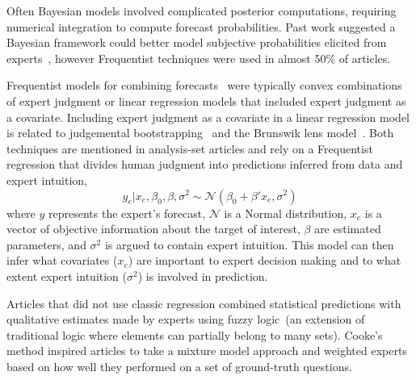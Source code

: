\documentclass[preprint,authoryear]{elsarticle}
\begin{document}
Often Bayesian models involved complicated posterior computations, requiring numerical integration to compute forecast probabilities.
Past work suggested a Bayesian framework could better model subjective probabilities elicited from experts~\citep{clemen2007advances}, however Frequentist techniques were used in almost 50\% of articles. 

Frequentist models for combining forecasts~\citep{cooke2014out,klas2010support,mak1996aggregating,hurley2002combining,morales2017characterization,borsuk2004predictive,hanea2018value,cabello2012combination,adams2009acceptability,alho1992estimating,evans1994use,jana2019interval,hora2015calibration,hathout2016uncertainty,wang2008probabilistic,ren2002optimal,kurowicka2010probabilistic,baldwin2015weighting,baecke2017investigating,seifert2013relative,gu2016expert,mu1999multi,graefe2014combining,alvarado2017expertise,shin2013robust,franses2011averaging} were typically convex combinations of expert judgment or linear regression models that included expert judgment as a covariate.
Including expert judgment as a covariate in a linear regression model is related to judgemental bootstrapping~\citep{armstrong2001judgmental} and the Brunswik lens model~\cite{hammond2001essential}. 
Both techniques are mentioned in analysis-set articles and rely on a Frequentist regression that divides human judgment into predictions inferred from data and expert intuition,
\begin{equation*}
  y_{e} | x_{e}, \beta_{0}, \beta, \sigma^{2}  \sim \mathcal{N}( \beta_{0} + \beta'x_{e} ,\sigma^{2})
\end{equation*}
where $y$ represents the expert's forecast, $\mathcal{N}$ is a Normal distribution, $x_{e}$ is a vector of objective information about the target of interest, $\beta$ are estimated parameters, and $\sigma^{2}$ is argued to contain expert intuition.
This model can then infer what covariates ($x_{e}$) are important to expert decision making and to what extent expert intuition ($\sigma^{2}$) is involved in prediction.

Articles that did not use classic regression combined statistical predictions with qualitative estimates made by experts using fuzzy logic~(an extension of traditional logic where elements can partially belong to many sets).
Cooke's method inspired articles to take a mixture model approach and weighted experts based on how well they performed on a set of ground-truth questions.
\end{document}
